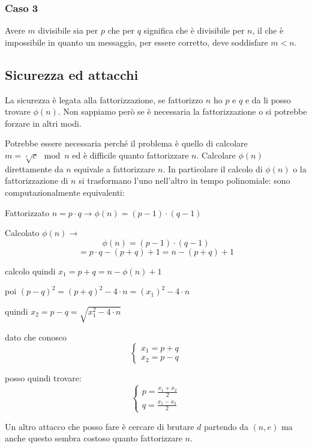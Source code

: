 \subsubsection{Caso 3}
Avere $m$ divisibile sia per $p$ che per $q$ significa che è divisibile per $n$, il che è impossibile in quanto un messaggio, per essere corretto, deve soddisfare $m < n$.

\subsection{Sicurezza ed attacchi}
La sicurezza è legata alla fattorizzazione, se fattorizzo $n$ ho $p$ e $q$ e da li posso trovare $\phi(n)$. Non sappiamo però se è necessaria la fattorizzazione o si potrebbe forzare in altri modi.

Potrebbe essere necessaria perché il problema è quello di calcolare $m = \sqrt[e]{c} \mod n$ ed è difficile quanto fattorizzare $n$.
Calcolare $\phi(n)$ direttamente da $n$ equivale a fattorizzare $n$.
In particolare il calcolo di $\phi(n)$ o la fattorizzazione di $n$ si trasformano l'uno nell'altro in tempo polinomiale: sono computazionalmente equivalenti:

Fattorizzato $n = p \cdot q \xrightarrow{} \phi(n) = (p-1) \cdot (q-1)$

Calcolato $\phi(n) \xrightarrow{} $
$$ \phi(n) = (p-1) \cdot (q-1) $$
$$ = p \cdot q - (p+q) + 1 = n - (p+q) + 1 $$

calcolo quindi $ x_1 = p+q = n - \phi(n) + 1 $

poi $ (p-q)^2 = (p+q)^2 - 4 \cdot n = (x_1)^2 - 4 \cdot n $

quindi $ x_2 = p - q = \sqrt{x_1^{2} - 4 \cdot n}$

dato che conosco
\begin{equation}
    \begin{cases}
    x_1 = p + q \\ 
    x_2 = p - q
    \end{cases}
\end{equation}

posso quindi trovare:
\begin{equation}
    \begin{cases}
    p = \frac{x_1 + x_2}{2} \\
    q = \frac{x_1 - x_2}{2}
    \end{cases}
\end{equation}

Un altro attacco che posso fare è cercare di brutare $d$ partendo da $(n,e)$ ma anche questo sembra costoso quanto fattorizzare $n$.

